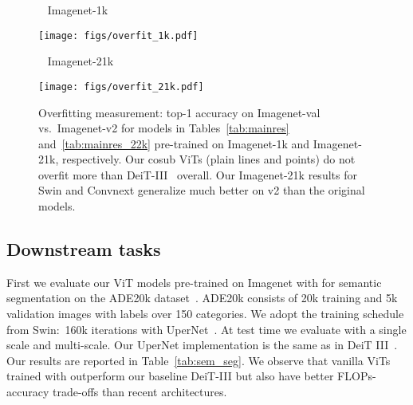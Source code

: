 \begin{figure}
\begin{minipage}{0.48 \linewidth}
    ~ \hfill \quad \footnotesize Imagenet-1k \hfill ~    
    
\texttt{[image: figs/overfit\_1k.pdf]}
    \end{minipage}
    \hfill
    \begin{minipage}{0.48 \linewidth}
    ~ \hfill \footnotesize Imagenet-21k \hfill ~
    
    \texttt{[image: figs/overfit\_21k.pdf]}
\end{minipage}
    \vspace{-0.5em}
    \caption{Overfitting measurement: top-1 accuracy on Imagenet-val vs.\ Imagenet-v2 for models in Tables~\ref{tab:mainres} and~\ref{tab:mainres_22k} pre-trained on Imagenet-1k and Imagenet-21k, respectively. Our cosub ViTs (plain lines and points) do not overfit more than DeiT-III~\cite{touvron2022deitIII} overall. Our Imagenet-21k results for Swin and Convnext generalize much better on v2 than the original models. 
\label{fig:imagenet_v2}
    }
    \vspace{-2em}
\end{figure}



\subsection{Downstream tasks}


First we evaluate our ViT models pre-trained on Imagenet with \ours for semantic segmentation on the  ADE20k dataset~\cite{Zhou2017ScenePT}. 
ADE20k consists of 20k training and 5k validation images with labels over 150 categories. 
We adopt the training schedule from Swin:~160k iterations with UperNet~\cite{xiao2018unified}. 
At test time we evaluate with a single scale and multi-scale.
Our UperNet implementation is the same as in  DeiT III~\cite{touvron2022deitIII}.
Our results are reported in Table~\ref{tab:sem_seg}.
We observe that vanilla ViTs trained with \ours outperform our baseline DeiT-III but also have better FLOPs-accuracy trade-offs than recent architectures. 


